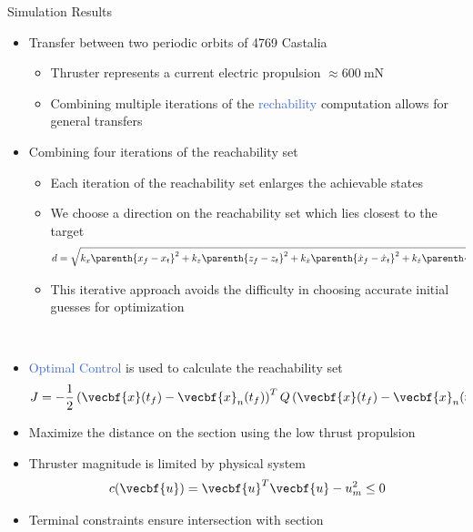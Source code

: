 \documentclass[final, usenames, dvipsnames]{beamer}
\newlength{\twocolwidth}
\def\Emph{\textcolor{RoyalBlue}}
\begin{document}
\begin{frame}[t]
\begin{columns}[T,onlytextwidth]
\begin{column}{\twocolwidth}
\begin{block}{Simulation Results} %
    \begin{minipage}[t]{0.5\columnwidth}
    \begin{itemize}
        \item Transfer between two periodic orbits of 4769 Castalia
        \begin{itemize}
            \item Thruster represents a current electric propulsion \( \approx \SI{600}{\milli\newton}\)
            \item Combining multiple iterations of the \Emph{rechability} computation allows for general transfers
        \end{itemize}
        \item Combining four iterations of the reachability set
        \begin{itemize}
            \item Each iteration of the reachability set enlarges the achievable states
            \item We choose a direction on the reachability set which lies closest to the target
            \[
                d = \sqrt{k_x \parenth{x_f - x_t }^2 + k_z \parenth{z_f - z_t }^2 + k_{\dot{x}}\parenth{\dot{x}_f - \dot{x}_t }^2 + k_{\dot{z}}\parenth{\dot{z}_f - \dot{z}_t }^2}
            \]
            \item This iterative approach avoids the difficulty in choosing accurate initial guesses for optimization
        \end{itemize}
    \end{itemize}
    \end{minipage}~
    \begin{minipage}[t]{0.5\columnwidth}
    \begin{itemize}
        \item \Emph{Optimal Control} is used to calculate the reachability set
            \[
            J = -\frac{1}{2} \left( \vecbf{x}(t_f) - \vecbf{x}_{n}(t_f)\right)^T Q \left( \vecbf{x}(t_f) - \vecbf{x}_{n}(t_f)\right) 
            \]
        \item Maximize the distance on the \Poincare section using the low thrust propulsion
        \item Thruster magnitude is limited by physical system
        \[
            c(\vecbf{u}) = \vecbf{u}^T \vecbf{u} - u_m^2 \leq 0 
        \]
        \item Terminal constraints ensure intersection with \Poincare section

\end{itemize}
\end{minipage}
\end{block}
\end{column}
\end{columns}
\end{frame}
\end{document}
